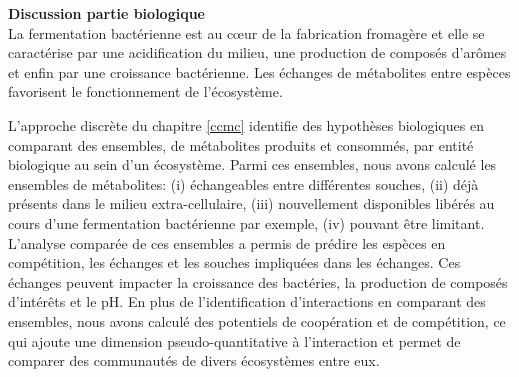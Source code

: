 \documentclass[../main.tex]{subfiles}
\begin{document}
\textbf{Discussion partie biologique}\\

La fermentation bactérienne est au c\oe{}ur de la fabrication fromagère et elle se caractérise par une acidification du milieu, une production de composés d'arômes et enfin par une croissance bactérienne. Les échanges de métabolites entre espèces favorisent le fonctionnement de l'écosystème.


L'approche discrète du chapitre \ref{ccmc} identifie des hypothèses biologiques en comparant des ensembles, de métabolites produits et consommés, par entité biologique au sein d'un écosystème. Parmi ces ensembles, nous avons calculé les ensembles de métabolites: (i) échangeables entre différentes souches, (ii) déjà présents dans le milieu extra-cellulaire, (iii) nouvellement disponibles libérés au cours d'une fermentation bactérienne par exemple, (iv) pouvant être limitant. L'analyse comparée de ces ensembles a permis de prédire les espèces en compétition, les échanges et les souches impliquées dans les échanges. Ces échanges peuvent impacter la croissance des bactéries, la production de composés d'intérêts et le pH. En plus de l'identification d'interactions en comparant des ensembles, nous avons calculé des potentiels de coopération et de compétition, ce qui ajoute une dimension pseudo-quantitative à l'interaction et permet de comparer des communautés de divers écosystèmes entre eux.
\end{document}
